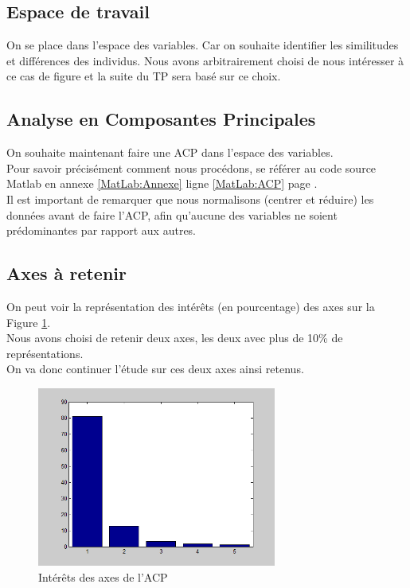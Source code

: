 \documentclass[11pt,oneside]{article}
\begin{document}
\subsection{Espace de travail}
On se place dans l'espace des variables. Car on souhaite identifier les similitudes et différences des individus. Nous avons arbitrairement choisi de nous intéresser à ce cas de figure et la suite du TP sera basé sur ce choix.\\

\subsection{Analyse en Composantes Principales}
On souhaite maintenant faire une ACP dans l'espace des variables.\\
Pour savoir précisément comment nous procédons, se référer au code source Matlab en annexe \ref{MatLab:Annexe} ligne \ref{MatLab:ACP} page \pageref{MatLab:ACP}.\\

Il est important de remarquer que nous normalisons (centrer et réduire) les données avant de faire l'ACP, afin qu'aucune des variables ne soient prédominantes par rapport aux autres.\\

\subsection{Axes à retenir}
On peut voir la représentation des intérêts (en pourcentage) des axes sur la Figure \ref{img:interest}.\\
Nous avons choisi de retenir deux axes, les deux avec plus de 10\% de représentations.\\
On va donc continuer l'étude sur ces deux axes ainsi retenus.\\

\begin{figure}
	\begin{center}
	\includegraphics[width=0.7\textwidth]{Images/Interest}
	\caption{Intérêts des axes de l'ACP}\label{img:interest}
	  \end{center}
\end{figure}
\FloatBarrier
\end{document}

